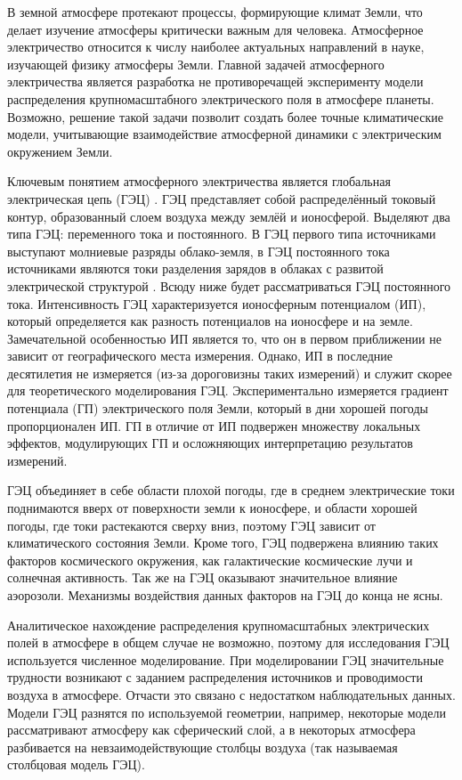 
В земной атмосфере протекают процессы, формирующие климат Земли, что делает изучение атмосферы критически важным для человека. Атмосферное электричество относится к числу наиболее актуальных направлений в науке, изучающей физику атмосферы Земли. Главной задачей атмосферного электричества является разработка не противоречащей эксперименту модели распределения крупномасштабного электрического поля в атмосфере планеты. Возможно, решение такой задачи позволит создать более точные климатические модели, учитывающие взаимодействие атмосферной динамики с электрическим окружением Земли.

Ключевым понятием атмосферного электричества является глобальная электрическая цепь (ГЭЦ) \cite{Williams_Mareev_2014}. ГЭЦ представляет собой распределённый токовый контур, образованный слоем воздуха между землёй и ионосферой. Выделяют два типа ГЭЦ: переменного тока и постоянного. В ГЭЦ первого типа источниками выступают молниевые разряды облако-земля, в ГЭЦ постоянного тока источниками являются токи разделения зарядов в облаках с развитой электрической структурой \cite{Williams_Mareev_2014}. Всюду ниже будет рассматриваться ГЭЦ постоянного тока. Интенсивность ГЭЦ характеризуется ионосферным потенциалом (ИП), который определяется как разность потенциалов на ионосфере и на земле. Замечательной особенностью ИП является то, что он в первом приближении не зависит от географического места измерения. Однако, ИП в последние десятилетия не измеряется (из-за дороговизны таких измерений) и служит скорее для теоретического моделирования ГЭЦ. Экспериментально измеряется градиент потенциала (ГП) электрического поля Земли, который в дни хорошей погоды пропорционален ИП. ГП в отличие от ИП подвержен множеству локальных эффектов, модулирующих ГП и осложняющих интерпретацию результатов измерений.

ГЭЦ объединяет в себе области плохой погоды, где в среднем электрические токи поднимаются вверх от поверхности земли к ионосфере, и области хорошей погоды, где токи растекаются сверху вниз, поэтому ГЭЦ зависит от климатического состояния Земли. Кроме того, ГЭЦ подвержена влиянию таких факторов космического окружения, как галактические космические лучи и солнечная активность. Так же на ГЭЦ оказывают значительное влияние аэорозоли. Механизмы воздействия данных факторов на ГЭЦ до конца не ясны.%

Аналитическое нахождение распределения крупномасштабных электрических полей в атмосфере в общем случае не возможно, поэтому для исследования ГЭЦ используется численное моделирование. При моделировании ГЭЦ значительные трудности возникают с заданием распределения источников и проводимости воздуха в атмосфере. Отчасти это связано с недостатком наблюдательных данных. Модели ГЭЦ разнятся по используемой геометрии, например, некоторые модели рассматривают атмосферу как сферический слой, а в некоторых атмосфера разбивается на невзаимодействующие столбцы воздуха (так называемая столбцовая модель ГЭЦ).

